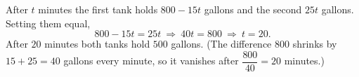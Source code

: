 After $t$ minutes the first tank holds $800-15t$ gallons and the second $25t$ gallons. Setting them equal,
\[
800-15t=25t\ \Longrightarrow\ 40t=800\ \Longrightarrow\ t=20 .
\]
After $\boxed{20}$ minutes both tanks hold $500$ gallons. (The difference $800$ shrinks by $15+25=40$ gallons every minute, so it vanishes after $\dfrac{800}{40}=20$ minutes.)
